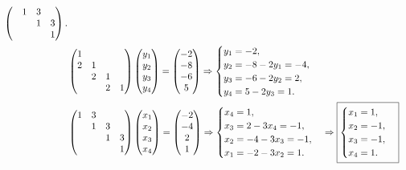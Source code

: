 \documentclass[hidelinks]{ctexart}
\begin{document}
\begin{align*}
\begin{pmatrix}
        & 1 & 3 & \\
        & & 1 & 3 \\
        & & & 1
    \end{pmatrix}. \\
\hspace{-3em} & \begin{pmatrix}
        1 & & & \\
        2 & 1 & & \\
        & 2 & 1 & \\
        & & 2 & 1
    \end{pmatrix}\begin{pmatrix}
        y_1 \\ y_2 \\ y_3 \\ y_4
    \end{pmatrix} = \begin{pmatrix}
        -2 \\ -8 \\ -6 \\ 5
    \end{pmatrix} \Rightarrow \begin{cases}
        y_1 = -2, \\
        y_2 = -8 - 2y_1 = -4, \\
        y_3 = -6 - 2y_2 = 2, \\
        y_4 = 5 - 2y_3 = 1.
    \end{cases} \\
\hspace{-3em} & \begin{pmatrix}
        1 & 3 & & \\
        & 1 & 3 & \\
        & & 1 & 3 \\
        & & & 1
    \end{pmatrix}\begin{pmatrix}
        x_1 \\ x_2 \\ x_3 \\ x_4
    \end{pmatrix} = \begin{pmatrix}
        -2 \\ -4 \\ 2 \\ 1
    \end{pmatrix} \Rightarrow \begin{cases}
        x_4 = 1,\\
        x_3 = 2-3x_4 = -1, \\
        x_2 = -4 - 3x_3 = -1, \\
        x_1 = -2 - 3x_2 = 1.
    \end{cases} \Rightarrow \boxed{\begin{cases}
        x_1 = 1, \\
        x_2 = -1, \\
        x_3 = -1, \\
        x_4 = 1.
    \end{cases}}
\end{align*}
\end{document}
